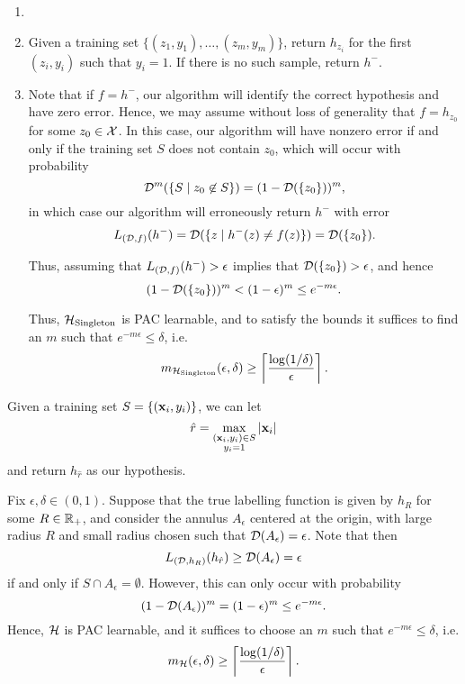 \begin{ex}
  \begin{enumerate}
    \item[]
    \item Given a training set $\{(z_1, y_1), \ldots, (z_m, y_m)\}$,
          return $h_{z_i}$ for the first $(z_i, y_i)$ such that $y_i=1$.
          If there is no such sample, return $h^-$.
    \item Note that if $f=h^-$, our algorithm will identify the correct
          hypothesis and have zero error. Hence, we may assume without loss of
          generality that $f=h_{z_0}$ for some $z_0\in\mathcal{X}$. In this case, our
          algorithm will have nonzero error if and only if the training set $S$
          does not contain $z_0$, which will occur with probability
          \[
            \mathcal{D}^m(\{S \mid z_0\not\in S\})
            =(1-\mathcal{D}(\{z_0\}))^m,
          \]
          in which case our algorithm will erroneously
          return $h^-$ with error
          \[
            L_{(\mathcal{D}, f)}(h^-)=\mathcal{D}(\{z \mid h^-(z) \neq f(z) \})=\mathcal{D}(\{z_0\}).
          \]

          Thus, assuming that $L_{(\mathcal{D}, f)}(h^-)>\epsilon$ implies that
          $\mathcal{D}(\{z_0\})>\epsilon$, and hence
          \[
            (1-\mathcal{D}(\{z_0\}))^m<(1-\epsilon)^m\leq e^{-m\epsilon}.
          \]

          Thus, $\mathcal{H}_\text{Singleton}$ is PAC learnable, and to satisfy the
          bounds it suffices to find an $m$ such that
          $e^{-m\epsilon}\leq\delta$, i.e.\
          \[
            m_{\mathcal{H}_\text{Singleton}}(\epsilon, \delta)
            \geq \left\lceil\frac{\log(1/\delta)}{\epsilon}\right\rceil.
          \]

  \end{enumerate}
\end{ex}

\begin{ex}
  Given a training set $S=\{(\mathbf{x}_i, y_i)\}$, we can let
  \[
    \hat{r}=\max_{\substack{(\mathbf{x}_i, y_i)\in S \\ y_i = 1}} |\mathbf{x}_i|
  \]
  and return $h_{\hat{r}}$ as our hypothesis.

  Fix $\epsilon, \delta\in (0,1)$. Suppose that the true labelling function is
  given by $h_R$ for some $R\in \mathbb{R}_+$, and consider the annulus $A_\epsilon$
  centered at the origin, with large radius $R$ and small radius chosen such
  that $\mathcal{D}(A_\epsilon)=\epsilon$. Note that then
  \[
    L_{(\mathcal{D}, h_R)}(h_{\hat{r}})\geq\mathcal{D}(A_\epsilon) =\epsilon
  \]
  if and only if $S\cap A_\epsilon=\emptyset$. However, this can only occur with
  probability
  \[
    (1-\mathcal{D}(A_\epsilon))^m=(1-\epsilon)^m\leq e^{-m\epsilon}.
  \]
  Hence, $\mathcal{H}$ is PAC learnable, and it suffices to choose an $m$ such
  that $e^{-m\epsilon}\leq \delta$, i.e.
  \[
    m_{\mathcal{H}}(\epsilon,\delta)
    \geq \left\lceil\frac{\log(1/\delta)}{\epsilon}\right\rceil.
  \]
\end{ex}

